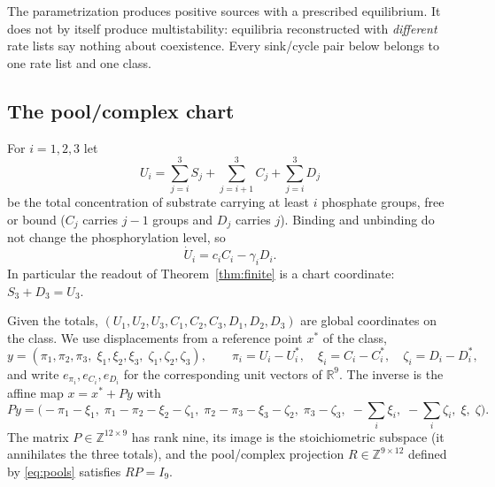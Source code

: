 \documentclass[11pt,a4paper]{article}
\theoremstyle{plain}
\theoremstyle{definition}
\theoremstyle{remark}
\newcommand{\R}{\mathbb R}
\newcommand{\Z}{\mathbb Z}
\begin{document}
The parametrization produces positive sources with a prescribed equilibrium. It does not by itself produce multistability: equilibria reconstructed with \emph{different} rate lists say nothing about coexistence. Every sink/cycle pair below belongs to one rate list and one class.

\subsection{The pool/complex chart}
For $i=1,2,3$ let
\begin{equation}\label{eq:pools}
U_i=\sum_{j=i}^{3}S_j+\sum_{j=i+1}^{3}C_j+\sum_{j=i}^{3}D_j
\end{equation}
be the total concentration of substrate carrying at least $i$ phosphate groups, free or bound ($C_j$ carries $j-1$ groups and $D_j$ carries $j$). Binding and unbinding do not change the phosphorylation level, so
\begin{equation}\label{eq:pooldot}
\dot U_i=c_iC_i-\gamma_iD_i .
\end{equation}
In particular the readout of Theorem~\ref{thm:finite} is a chart coordinate: $S_3+D_3=U_3$.

Given the totals, $(U_1,U_2,U_3,C_1,C_2,C_3,D_1,D_2,D_3)$ are global coordinates on the class. We use displacements from a reference point $x^*$ of the class,
\[
y=(\pi_1,\pi_2,\pi_3,\;\xi_1,\xi_2,\xi_3,\;\zeta_1,\zeta_2,\zeta_3),\qquad
\pi_i=U_i-U_i^*,\quad \xi_i=C_i-C_i^*,\quad \zeta_i=D_i-D_i^*,
\]
and write $e_{\pi_i},e_{C_i},e_{D_i}$ for the corresponding unit vectors of $\R^9$. The inverse is the affine map $x=x^*+Py$ with
\begin{equation}\label{eq:lift}
Py=\bigl(-\pi_1-\xi_1,\;\pi_1-\pi_2-\xi_2-\zeta_1,\;\pi_2-\pi_3-\xi_3-\zeta_2,\;\pi_3-\zeta_3,\;
-\textstyle\sum_i\xi_i,\;-\sum_i\zeta_i,\;\xi,\;\zeta\bigr).
\end{equation}
The matrix $P\in\Z^{12\times9}$ has rank nine, its image is the stoichiometric subspace (it annihilates the three totals), and the pool/complex projection $R\in\Z^{9\times12}$ defined by \eqref{eq:pools} satisfies $RP=I_9$.
\end{document}
